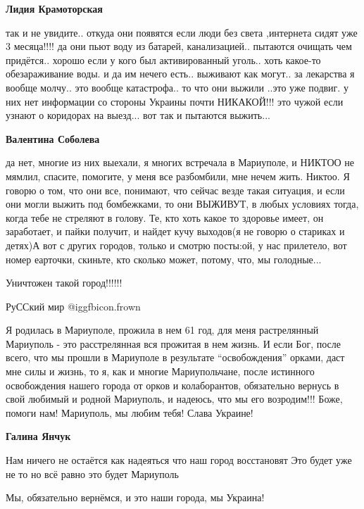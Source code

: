 \begin{itemize}
\begin{itemize} %
\textbf{Лидия Крамоторская} 

так и не увидите.. откуда они появятся если люди без света ,интернета сидят уже
3 месяца!!!! да они пьют воду из батарей, канализацией.. пытаются очищать чем
придётся.. хорошо если у кого был активированный уголь.. хоть какое-то
обезараживание воды. и да им нечего есть.. выживают как могут.. за лекарства я
вообще молчу.. это вообще катастрофа.. то что они выжили ..это уже подвиг. у них
нет информации со стороны Украины почти НИКАКОЙ!!! это чужой если узнают о
коридорах на выезд... вот так и пытаются выжить...

\textbf{Валентина Соболева} 

да нет, многие из них выехали, я многих встречала в Мариуполе, и НИКТОО не
мямлил, спасите, помогите, у меня все разбомбили, мне нечем жить. Никтоо. Я говорю о
том, что они все, понимают, что сейчас везде такая ситуация, и если они могли
выжить под бомбежками, то они ВЫЖИВУТ, в любых условиях тогда, когда тебе не
стреляют в голову. Те, кто хоть какое то здоровье имеет, он заработает, и пайки
получит, и найдет кучу выходов(я не говорю о стариках и детях)А вот с других
городов, только и смотрю посты:ой, у нас прилетело, вот номер еарточки, скиньте, кто
сколько может, потому, что, мы голодные...

\end{itemize} %

Уничтожен такой город!!!!!!

РуССкий мир  @igg{fbicon.frown} 


Я родилась в Мариуполе, прожила в нем 61 год, для меня растрелянный Мариуполь -
это расстрелянная вся прожитая в нем жизнь. И если Бог, после всего, что мы
прошли в Мариуполе в результате \enquote{освобождения} орками, даст мне силы и жизнь,
то я, как и многие Мариупольчане, после истинного освобождения нашего города от
орков и колаборантов, обязательно вернусь в свой любимый и родной Мариуполь, и
надеюсь, что мы его возродим!!! Боже, помоги нам! Мариуполь, мы любим тебя!
Слава Украине!

\textbf{Галина Янчук} 

Нам ничего не остаётся как надеяться что наш город восстановят Это будет уже не
то но всё равно это будет Мариуполь

Мы, обязательно вернёмся, и это наши города, мы Украина!


\end{itemize}
